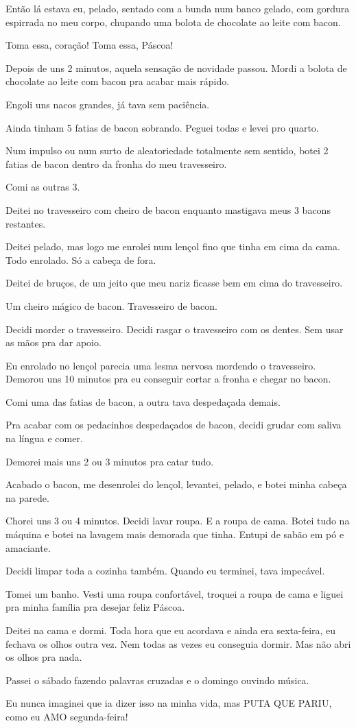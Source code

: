 Então lá estava eu, pelado, sentado com a bunda num banco gelado, com gordura espirrada no meu corpo, chupando uma bolota de chocolate ao leite com bacon.

Toma essa, coração! Toma essa, Páscoa!

Depois de uns 2 minutos, aquela sensação de novidade passou. Mordi a bolota de chocolate ao leite com bacon pra acabar mais rápido.

Engoli uns nacos grandes, já tava sem paciência.

Ainda tinham 5 fatias de bacon sobrando. Peguei todas e levei pro quarto.

Num impulso ou num surto de aleatoriedade totalmente sem sentido, botei 2 fatias de bacon dentro da fronha do meu travesseiro.

Comi as outras 3.

\begin{sloppypar}
Deitei no travesseiro com cheiro de bacon enquanto mastigava meus 3 bacons restantes.
\end{sloppypar}

Deitei pelado, mas logo me enrolei num lençol fino que tinha em cima da cama. Todo enrolado. Só a cabeça de fora.

Deitei de bruços, de um jeito que meu nariz ficasse bem em cima do travesseiro.

Um cheiro mágico de bacon. Travesseiro de bacon.

Decidi morder o travesseiro. Decidi rasgar o travesseiro com os dentes. Sem usar as mãos pra dar apoio.

Eu enrolado no lençol parecia uma lesma nervosa mordendo o travesseiro. Demorou uns 10 minutos pra eu conseguir cortar a fronha e chegar no bacon.

Comi uma das fatias de bacon, a outra tava despedaçada demais.

Pra acabar com os pedacinhos despedaçados de bacon, decidi grudar com saliva na língua e comer.

Demorei mais uns 2 ou 3 minutos pra catar tudo.

Acabado o bacon, me desenrolei do lençol, levantei, pelado, e botei minha cabeça na parede.

Chorei uns 3 ou 4 minutos. Decidi lavar roupa. E a roupa de cama. Botei tudo na máquina e botei na lavagem mais demorada que tinha. Entupi de sabão em pó e amaciante.

Decidi limpar toda a cozinha também. Quando eu terminei, tava impecável.

Tomei um banho. Vesti uma roupa confortável, troquei a roupa de cama e liguei pra minha família pra desejar feliz Páscoa.

Deitei na cama e dormi. Toda hora que eu acordava e ainda era sexta-feira, eu fechava os olhos outra vez. Nem todas as vezes eu conseguia dormir. Mas não abri os olhos pra nada.

Passei o sábado fazendo palavras cruzadas e o domingo ouvindo música.

Eu nunca imaginei que ia dizer isso na minha vida, mas PUTA QUE PARIU, como eu AMO segunda-feira!
